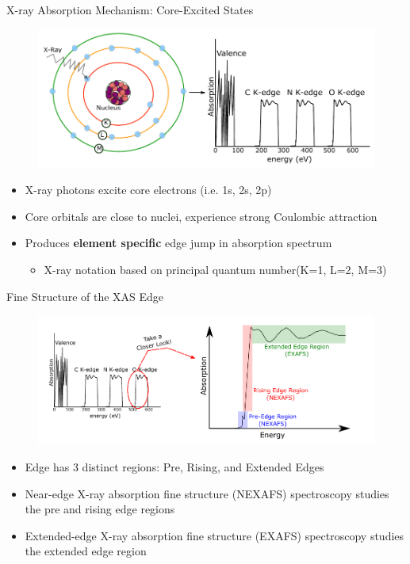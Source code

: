 \documentclass[t]{beamer}
\begin{document}
\begin{frame}{X-ray Absorption Mechanism: Core-Excited States}
\begin{figure}
\includegraphics[scale=0.7]{core_mechanism_2.pdf}
\end{figure}
\begin{itemize}
\item X-ray photons excite core electrons (i.e. 1s, 2s, 2p)
\item Core orbitals are close to nuclei, experience strong Coulombic attraction
\item Produces \textbf{element specific} edge jump in absorption spectrum
		\begin{itemize}
		\item X-ray notation based on principal quantum number\footnotemark (K=1, L=2, M=3)
		\end{itemize}
\end{itemize}
\end{frame}

\begin{frame}{Fine Structure of the XAS Edge}
\begin{figure}
\includegraphics[scale=0.7]{fine_structure.pdf}
\end{figure}
\begin{itemize}
\item Edge has 3 distinct regions: Pre, Rising, and Extended Edges
\item Near-edge X-ray absorption fine structure (NEXAFS) spectroscopy studies the pre and rising edge regions
\item Extended-edge X-ray absorption fine structure (EXAFS) spectroscopy studies the extended edge region\footnotemark
\end{itemize}
\end{frame}
\end{document}
